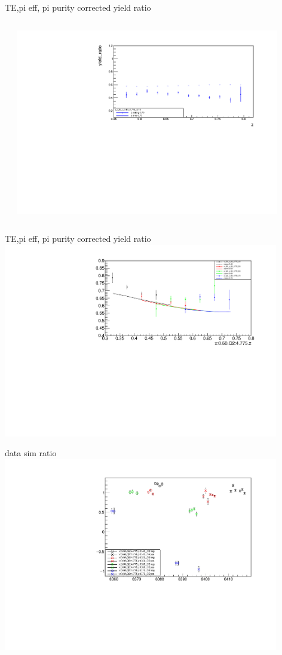 \begin{frame}{TE,pi eff, pi purity corrected yield ratio}
\begin{columns}
\begin{column}[T]{0.5\textwidth}
\end{column}
\begin{column}[T]{0.5\textwidth}
\includegraphics[width = 0.9\textwidth]{results/yield/statistics_corr/x_Q2_z_60_4775_70_ratio.pdf}
\end{column}
\end{columns}
\end{frame}
\begin{frame}{TE,pi eff, pi purity corrected yield ratio}
\includegraphics[width = 0.9\textwidth]{results/yield/statistics_corr/x_Q2_60_4775_ratio.pdf}
\end{frame}
\begin{frame}{data sim ratio}
    \includegraphics[width = 0.9\textwidth]{results/yield/run_info_pdf/x_Q2_60_4775_data_simc_ratio.pdf}
\end{frame}
